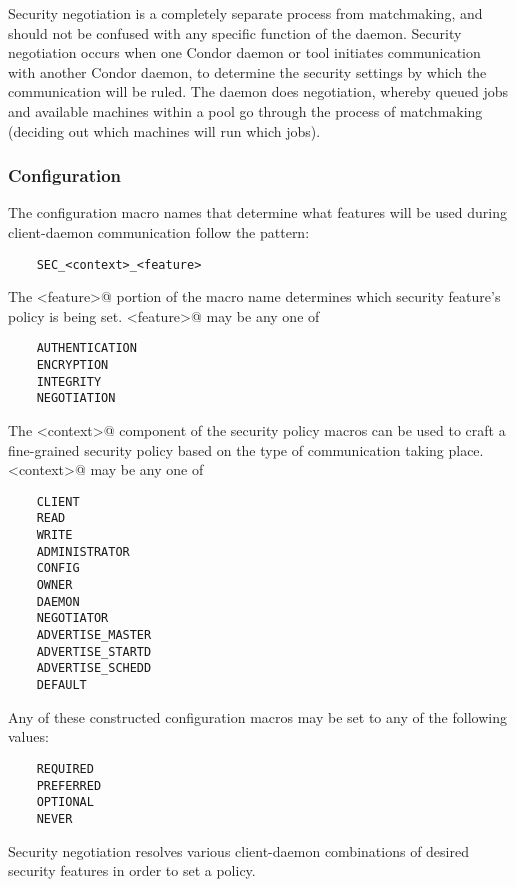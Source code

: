 Security negotiation is a completely separate process from
matchmaking, and should not be confused with any specific function of
the  daemon. 
Security negotiation occurs when one
Condor daemon or tool initiates communication with another Condor daemon,
to determine the security settings by which the communication will
be ruled.
The  daemon does negotiation,
whereby queued jobs and available machines within a pool
go through the process of matchmaking (deciding out which
machines will run which jobs).

\subsubsection{\label{sec:security-negotiation-features}Configuration}

The configuration macro names that determine what features will be used during
client-daemon communication follow the pattern:
\begin{verbatim}
    SEC_<context>_<feature>
\end{verbatim}

The \verb@<feature>@
portion of the macro name determines which security feature's
policy is being set.
\verb@<feature>@ may be any one of
\begin{verbatim}
    AUTHENTICATION
    ENCRYPTION
    INTEGRITY
    NEGOTIATION
\end{verbatim}

The \verb@<context>@ component of the security policy macros can be
used to craft a fine-grained security policy based on the type of
communication taking place.
\verb@<context>@ may be any one of
\begin{verbatim}
    CLIENT
    READ
    WRITE
    ADMINISTRATOR
    CONFIG
    OWNER
    DAEMON
    NEGOTIATOR
    ADVERTISE_MASTER
    ADVERTISE_STARTD
    ADVERTISE_SCHEDD
    DEFAULT
\end{verbatim}

Any of these constructed configuration macros may be set to
any of the following values:
\begin{verbatim}
    REQUIRED
    PREFERRED
    OPTIONAL
    NEVER 
\end{verbatim}

Security negotiation resolves various client-daemon combinations
of desired security features in order to set a policy.

